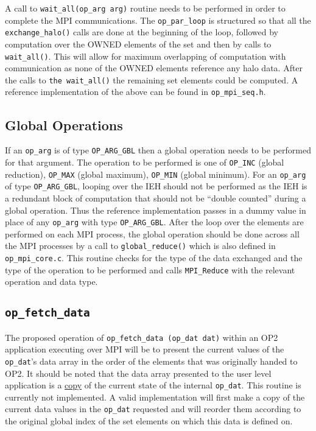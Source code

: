 \documentclass[12pt]{article}
\begin{document}
\noindent A call to \texttt{wait\_all(op\_arg arg)} routine needs to be performed in order to complete the MPI
communications. The \texttt{op\_par\_loop} is structured so that all the \texttt{exchange\_halo()} calls are done at the
beginning of the loop, followed by computation over the OWNED elements of the set and then by calls to
\texttt{wait\_all()}. This will allow for maximum overlapping of computation with communication as none of the OWNED
elements reference any halo data. After the calls to \texttt{the wait\_all()} the remaining set elements could be
computed. A reference implementation of the above can be found in \texttt{op\_mpi\_seq.h}.

\subsection{Global Operations}\label{subsec/globalops}

If an \texttt{op\_arg} is of type \texttt{OP\_ARG\_GBL} then a global operation needs to be performed for that
argument. The operation to be performed is one of \texttt{OP\_INC} (global reduction), \texttt{OP\_MAX} (global
maximum), \texttt{OP\_MIN} (global minimum). For an \texttt{op\_arg} of type \texttt{OP\_ARG\_GBL}, looping over the
IEH should not be performed as the IEH is a redundant block of computation that should not be ``double counted'' during
a global operation. Thus the reference implementation passes in a dummy value in place of any \texttt{op\_arg} with
type \texttt{OP\_ARG\_GBL}. After the loop over the elements are performed on each MPI process, the global operation
should be done across all the MPI processes by a call to \texttt{global\_reduce()} which is also defined in
\texttt{op\_mpi\_core.c}. This routine checks for the type of the data exchanged and the type of the operation to be
performed and calls \texttt{MPI\_Reduce} with the relevant operation and data type.

\subsection{\texttt{op\_fetch\_data} }\label{subsec/putfetch}
The proposed operation of \texttt{op\_fetch\_data (op\_dat dat)} within an OP2 application executing over MPI will be to
present the current values of the \texttt{op\_dat}'s data array in the order of the elements that was originally handed
to OP2. It should be noted that the data array presented to the user level application is a \underline{copy} of the
current state of the internal \texttt{op\_dat}. This routine is currently not implemented. A valid implementation will
first make a copy of the current data values in the \texttt{op\_dat} requested and will reorder them according to the 
original global index of the set elements on which this data is defined on. 
\end{document}
